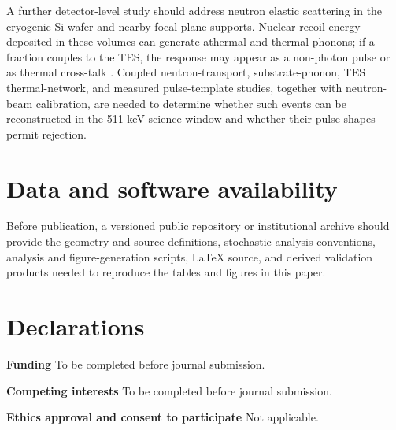 \documentclass[11pt]{article}
\begin{document}
\newpage
\begin{samepage}
A further detector-level study should address neutron elastic scattering in
the cryogenic Si wafer and nearby focal-plane supports. Nuclear-recoil energy
deposited in these volumes can generate athermal and thermal phonons; if a
fraction couples to the TES, the response may appear as a non-photon pulse or
as thermal cross-talk \cite{Agnese2018NuclearRecoil,Hull2023ThermalBackground}.
Coupled neutron-transport, substrate-phonon, TES thermal-network, and measured
pulse-template studies, together with neutron-beam calibration, are needed to
determine whether such events can be reconstructed in the 511 keV science
window and whether their pulse shapes permit rejection.
\end{samepage}

\section*{Data and software availability}
Before publication, a versioned public repository or institutional archive should provide the geometry and source definitions, stochastic-analysis conventions, analysis and figure-generation scripts, LaTeX source, and derived validation products needed to reproduce the tables and figures in this paper.

\section*{Declarations}
\textbf{Funding} To be completed before journal submission.

\textbf{Competing interests} To be completed before journal submission.


\textbf{Ethics approval and consent to participate} Not applicable.
\end{document}

